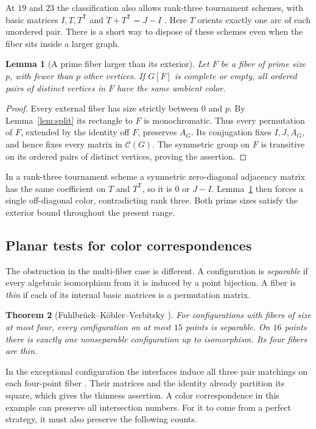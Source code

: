 \documentclass[11pt,reqno]{amsart}
\numberwithin{equation}{section}
\newtheorem{theorem}{Theorem}[section]
\newtheorem{lemma}[theorem]{Lemma}
\theoremstyle{definition}
\begin{document}
At $19$ and $23$ the classification also allows rank-three tournament schemes, with basic matrices $I,T,T^{\mathsf T}$ and $T+T^{\mathsf T}=J-I$ \cite[Tables~2--3 and \S4.2]{ZivAv}. Here $T$ orients exactly one arc of each unordered pair. There is a short way to dispose of these schemes even when the fiber sits inside a larger graph.
\begin{lemma}[A prime fiber larger than its exterior]\label{lem:twins}
Let $F$ be a fiber of prime size $p$, with fewer than $p$ other vertices. If $G[F]$ is complete or empty, all ordered pairs of distinct vertices in $F$ have the same ambient color.
\end{lemma}
\begin{proof}
Every external fiber has size strictly between $0$ and $p$. By Lemma~\ref{lem:split} its rectangle to $F$ is monochromatic. Thus every permutation of $F$, extended by the identity off $F$, preserves $A_G$. Its conjugation fixes $I,J,A_G$, and hence fixes every matrix in $\mathcal C(G)$. The symmetric group on $F$ is transitive on its ordered pairs of distinct vertices, proving the assertion.
\end{proof}
In a rank-three tournament scheme a symmetric zero-diagonal adjacency matrix has the same coefficient on $T$ and $T^{\mathsf T}$, so it is $0$ or $J-I$. Lemma~\ref{lem:twins} then forces a single off-diagonal color, contradicting rank three. Both prime sizes satisfy the exterior bound throughout the present range.

\subsection{Planar tests for color correspondences}\label{sec:tests}
The obstruction in the multi-fiber case is different. A configuration is \emph{separable} if every algebraic isomorphism from it is induced by a point bijection. A fiber is \emph{thin} if each of its internal basic matrices is a permutation matrix.
\begin{theorem}[Fuhlbr\"uck--K\"obler--Verbitsky {\cite[Thm.~11.1]{FKV}}]\label{thm:fkv-precise}
For configurations with fibers of size at most four, every configuration on at most $15$ points is separable. On $16$ points there is exactly one nonseparable configuration up to isomorphism. Its four fibers are thin.
\end{theorem}
In the exceptional configuration the interfaces induce all three pair matchings on each four-point fiber \cite[Lem.~5.2 and Fig.~17]{FKV}. Their matrices and the identity already partition its square, which gives the thinness assertion. A color correspondence in this example can preserve all intersection numbers. For it to come from a perfect strategy, it must also preserve the following counts.
\end{document}
